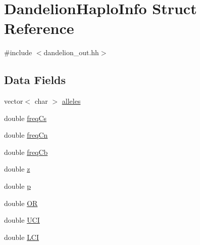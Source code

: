 \hypertarget{structDandelionHaploInfo}{
\section{DandelionHaploInfo Struct Reference}
\label{structDandelionHaploInfo}
}


{\ttfamily \#include $<$dandelion\_\-out.hh$>$}

\subsection*{Data Fields}
\begin{DoxyCompactItemize}
\item 
vector$<$ char $>$ \hyperlink{structDandelionHaploInfo_af54d760696f9e4e7f3acaba503b6558c}{alleles}
\item 
double \hyperlink{structDandelionHaploInfo_a015f6e666bc1e405cd536576269d13b8}{freqCs}
\item 
double \hyperlink{structDandelionHaploInfo_aa3f299599bd3849b31a4e3490a0babbb}{freqCn}
\item 
double \hyperlink{structDandelionHaploInfo_aa2d64bf0ece7cb0b33e97e3ef12a21e3}{freqCb}
\item 
double \hyperlink{structDandelionHaploInfo_a3121158a7720b61247ecbc6e13b4c389}{z}
\item 
double \hyperlink{structDandelionHaploInfo_a987c710ff44dec51b853659f5b5450f1}{p}
\item 
double \hyperlink{structDandelionHaploInfo_a1342df0d3256a2378be3f3512810bce4}{OR}
\item 
double \hyperlink{structDandelionHaploInfo_a797db41ac3fb4e6360ec3e20cafe5999}{UCI}
\item 
double \hyperlink{structDandelionHaploInfo_a816709cc46ab54a0a6afe7e5e48d9a22}{LCI}
\end{DoxyCompactItemize}


